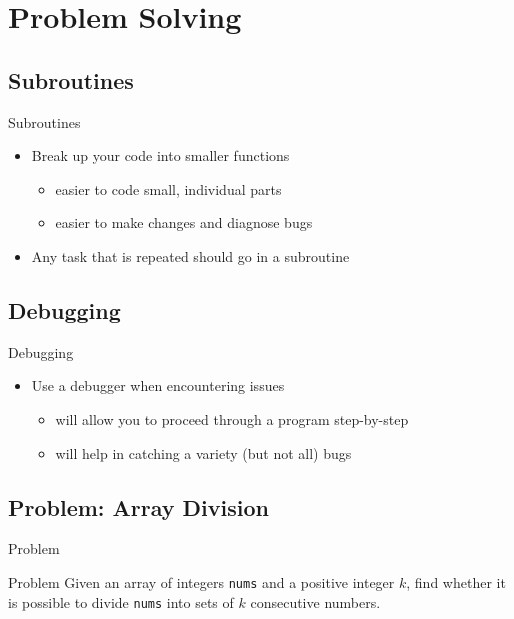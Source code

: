 \section{Problem Solving}
\subsection{Subroutines}
\begin{frame}{Subroutines}
    \pause
    \begin{itemize}[<+->]
        \item Break up your code into smaller functions
              \begin{itemize}[<+->]
                  \item easier to code small, individual parts
                  \item easier to make changes and diagnose bugs
              \end{itemize}
        \item Any task that is repeated should go in a subroutine
    \end{itemize}
\end{frame}

\subsection{Debugging}
\begin{frame}{Debugging}
    \pause
    \begin{itemize}[<+->]
        \item Use a debugger when encountering issues
              \begin{itemize}[<+->]
                  \item will allow you to proceed through a program step-by-step
                  \item will help in catching a variety (but not all) bugs
              \end{itemize}
    \end{itemize}
\end{frame}

\subsection{Problem: Array Division}
\begin{frame}{Problem}
    \pause
    \begin{block}{Problem}
        Given an array of integers \texttt{nums} and a positive integer $k$, find whether it is possible to divide \texttt{nums} into sets of  $k$ consecutive numbers.
    \end{block}
\end{frame}

